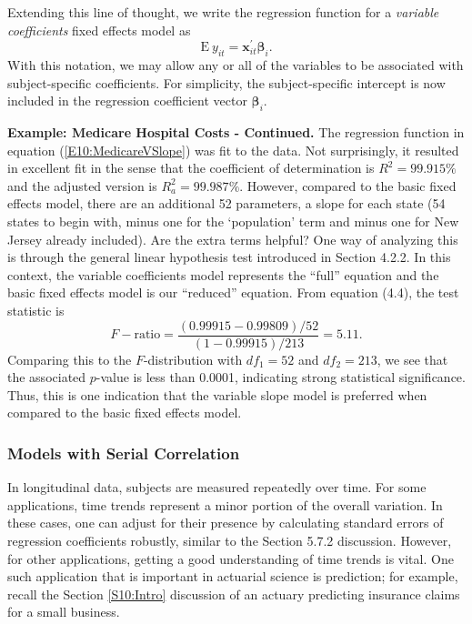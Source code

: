 Extending this line of thought, we write the regression function for
a \emph{variable coefficients} fixed effects model as
\begin{equation*}
\mathrm{E}~y_{it} =  \mathbf{x}_{it}^{\prime} \boldsymbol \beta_i.
\end{equation*}
With this notation, we may allow any or all of the variables to be
associated with subject-specific coefficients. For simplicity, the
subject-specific intercept is now included in the regression
coefficient vector $ \boldsymbol \beta_i$.

\linejed

\textbf{Example: Medicare Hospital Costs - Continued.} The
regression function in equation (\ref{E10:MedicareVSlope}) was fit
to the data. Not surprisingly, it resulted in excellent fit in the
sense that the coefficient of determination is $R^2 = 99.915 \% $
and the adjusted version is $R_a^2 = 99.987 \% $. However, compared
to the basic fixed effects model, there are an additional 52
parameters, a slope for each state (54 states to begin with, minus
one for the `population' term and minus one for New Jersey already
included). Are the extra terms helpful? One way of analyzing this is
through the general linear hypothesis test introduced in Section
4.2.2. In this context, the variable coefficients model represents
the ``full'' equation and the basic fixed effects model is our
``reduced'' equation. From equation (4.4), the test statistic is
\begin{equation*}
F-\textrm{ratio} = \frac {(0.99915 - 0.99809)/52}{(1-0.99915)/213} =
5.11 .
\end{equation*}
Comparing this to the $F$-distribution with $df_1 = 52$ and $df_2 =
213$, we see that the associated $p$-value is less than 0.0001,
indicating strong statistical significance. Thus, this is one
indication that the variable slope model is preferred when compared
to the basic fixed effects model.

\linejed


\subsubsection*{Models with Serial Correlation}

In longitudinal data, subjects are measured repeatedly over time.
For some applications, time trends represent a minor portion of the
overall variation. In these cases, one can adjust for their presence
by calculating standard errors of regression coefficients robustly,
similar to the Section 5.7.2 discussion. However, for other
applications, getting a good understanding of time trends is vital.
One such application that is important in actuarial science is
prediction; for example, recall the Section \ref{S10:Intro}
discussion of an actuary predicting insurance claims for a small
business.

